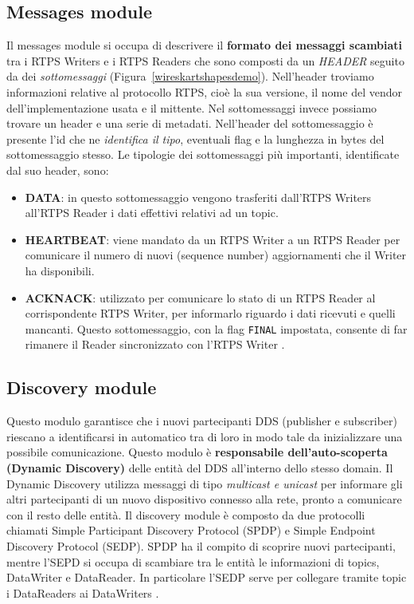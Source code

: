 \subsection{Messages module}
Il messages module si occupa di descrivere il \textbf{formato dei messaggi scambiati}
tra i RTPS Writers e i RTPS Readers che sono composti da un \textit{HEADER}
seguito da dei \textit{sottomessaggi} (Figura~\ref{wireskartshapesdemo}). 
Nell'header troviamo informazioni relative al
protocollo RTPS, cioè la sua versione, il nome del vendor dell'implementazione
usata e il mittente. Nel sottomessaggi invece possiamo trovare un header
e una serie di metadati. Nell'header del sottomessaggio
è presente l'id che ne
\textit{identifica il tipo}, eventuali flag e la lunghezza in bytes 
del sottomessaggio stesso. Le tipologie dei sottomessaggi più importanti, 
identificate dal suo header, sono:
\begin{itemize}
    \item \textbf{DATA}: in questo sottomessaggio vengono trasferiti dall'RTPS Writers
    all'RTPS Reader i dati effettivi relativi ad un topic.
    \item \textbf{HEARTBEAT}: viene mandato da un RTPS Writer a un RTPS Reader per 
    comunicare il numero di nuovi (sequence number) aggiornamenti che il 
    Writer ha disponibili.
    \item \textbf{ACKNACK}: utilizzato per comunicare lo stato di un RTPS Reader 
    al corrispondente RTPS Writer, per informarlo riguardo i dati ricevuti
    e quelli mancanti. Questo sottomessaggio, con la flag \texttt{FINAL} 
    impostata, consente di far rimanere il Reader sincronizzato con l'RTPS
    Writer \cite{ddsrtps}.
\end{itemize} \label{Messages module}


\subsection{Discovery module}
Questo modulo garantisce che i nuovi partecipanti DDS (publisher e subscriber)
riescano a identificarsi in automatico tra di loro in modo tale da inizializzare una 
possibile comunicazione. Questo modulo 
è \textbf{responsabile dell'auto-scoperta 
(Dynamic Discovery)}
delle entità del DDS all'interno dello stesso domain. Il Dynamic Discovery
utilizza messaggi di tipo \textit{multicast e unicast} 
per informare gli altri partecipanti
di un nuovo dispositivo connesso alla rete, pronto a comunicare con il
resto delle entità. Il discovery module è composto da due protocolli chiamati
Simple Participant Discovery Protocol (SPDP) e 
Simple Endpoint Discovery Protocol (SEDP). 
SPDP ha il compito di scoprire nuovi 
partecipanti, mentre l'SEPD si occupa di scambiare tra
le entità le informazioni
di topics, DataWriter e DataReader. In particolare l'SEDP serve per collegare
tramite topic i DataReaders ai DataWriters \cite{ddsrtps}.
\label{Discovery module}

